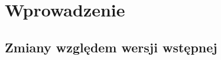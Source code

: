 \section{Wprowadzenie}
\label{section:Wprowadzenie}


\subsection{Zmiany względem wersji wstępnej}
\label{subsection:Zmiany}



